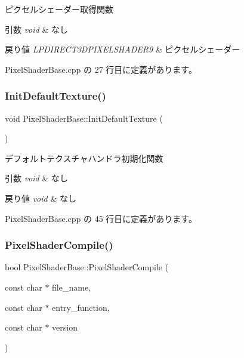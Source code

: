 ピクセルシェーダー取得関数 


\begin{DoxyParams}{引数}
{\em void} & なし \\
\hline
\end{DoxyParams}

\begin{DoxyRetVals}{戻り値}
{\em L\+P\+D\+I\+R\+E\+C\+T3\+D\+P\+I\+X\+E\+L\+S\+H\+A\+D\+E\+R9} & ピクセルシェーダー \\
\hline
\end{DoxyRetVals}


 Pixel\+Shader\+Base.\+cpp の 27 行目に定義があります。

\mbox{\label{class_pixel_shader_base_af72a2206bace384df51f34393053cf1e}} 
\subsubsection{\texorpdfstring{Init\+Default\+Texture()}{InitDefaultTexture()}}
{\footnotesize\ttfamily void Pixel\+Shader\+Base\+::\+Init\+Default\+Texture (\begin{DoxyParamCaption}{ }\end{DoxyParamCaption})}



デフォルトテクスチャハンドラ初期化関数 


\begin{DoxyParams}{引数}
{\em void} & なし \\
\hline
\end{DoxyParams}

\begin{DoxyRetVals}{戻り値}
{\em void} & なし \\
\hline
\end{DoxyRetVals}


 Pixel\+Shader\+Base.\+cpp の 45 行目に定義があります。

\mbox{\label{class_pixel_shader_base_ac572f1cb13a4486fc8bc2e60e5a14dc4}} 
\subsubsection{\texorpdfstring{Pixel\+Shader\+Compile()}{PixelShaderCompile()}}
{\footnotesize\ttfamily bool Pixel\+Shader\+Base\+::\+Pixel\+Shader\+Compile (\begin{DoxyParamCaption}\item[{const char $\ast$}]{file\+\_\+name,  }\item[{const char $\ast$}]{entry\+\_\+function,  }\item[{const char $\ast$}]{version }\end{DoxyParamCaption})}



